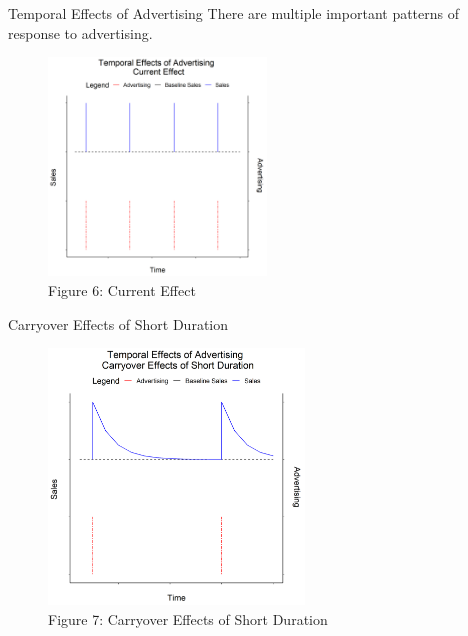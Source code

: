 \documentclass[pdf]{beamer}
\theoremstyle{remark}
\theoremstyle{definition}
\begin{document}
\begin{frame}[t]{Temporal Effects of Advertising}
There are multiple important patterns of response to advertising.  \\
\vspace{1.5ex}
\begin{figure}[htbp]
  \captionsetup{justification=centering}
  \includegraphics[height=5.8cm, trim=0.3cm 0.3cm 0.3cm 0.3cm width=5.8cm]{../BUSA_603_Ad_Response/Output/m5_1.png}
  \caption{Figure {\color{franklinblue} 6}: Current Effect}
\end{figure}
\end{frame}

\begin{frame}[t]{Carryover Effects of Short Duration}
\begin{figure}[htbp]
  \captionsetup{justification=centering}
  \includegraphics[height=6.8cm, trim=0.3cm 0.3cm 0.3cm 0.3cm width=6.8cm]{../BUSA_603_Ad_Response/Output/m5_2.png}
  \caption{Figure {\color{franklinblue} 7}: Carryover Effects of Short Duration}
\end{figure}
\end{frame}
\end{document}
